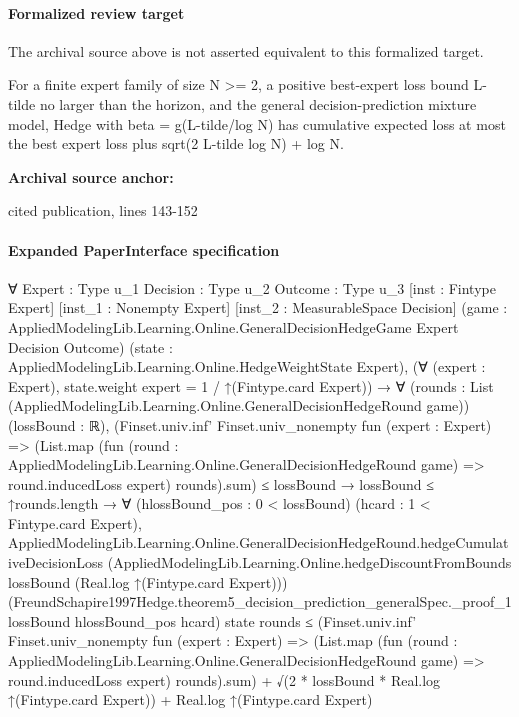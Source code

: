 \documentclass[10pt]{article}
\begin{document}
\paragraph{Formalized review target}
The archival source above is not asserted equivalent to this formalized target.
\begin{ReviewVerbatim}
For a finite expert family of size N >= 2, a positive best-expert loss bound L-tilde no larger than the horizon, and the general decision-prediction mixture model, Hedge with beta = g(L-tilde/log N) has cumulative expected loss at most the best expert loss plus sqrt(2 L-tilde log N) + log N.
\end{ReviewVerbatim}

\textbf{Archival source anchor:} {\footnotesize\raggedright cited publication, lines 143-\allowbreak{}152\par}
\paragraph{Expanded PaperInterface specification}
\begin{ReviewVerbatim}
∀ {Expert : Type u_1} {Decision : Type u_2} {Outcome : Type u_3} [inst : Fintype Expert] [inst_1 : Nonempty Expert]
  [inst_2 : MeasurableSpace Decision]
  (game : AppliedModelingLib.Learning.Online.GeneralDecisionHedgeGame Expert Decision Outcome)
  (state : AppliedModelingLib.Learning.Online.HedgeWeightState Expert),
  (∀ (expert : Expert), state.weight expert = 1 / ↑(Fintype.card Expert)) →
    ∀ (rounds : List (AppliedModelingLib.Learning.Online.GeneralDecisionHedgeRound game)) (lossBound : ℝ),
      (Finset.univ.inf' Finset.univ_nonempty fun (expert : Expert) =>
            (List.map
                (fun (round : AppliedModelingLib.Learning.Online.GeneralDecisionHedgeRound game) =>
                  round.inducedLoss expert)
                rounds).sum) ≤
          lossBound →
        lossBound ≤ ↑rounds.length →
          ∀ (hlossBound_pos : 0 < lossBound) (hcard : 1 < Fintype.card Expert),
            AppliedModelingLib.Learning.Online.GeneralDecisionHedgeRound.hedgeCumulativeDecisionLoss
                (AppliedModelingLib.Learning.Online.hedgeDiscountFromBounds lossBound (Real.log ↑(Fintype.card Expert)))
                (FreundSchapire1997Hedge.theorem5_decision_prediction_generalSpec._proof_1 lossBound hlossBound_pos
                  hcard)
                state rounds ≤
              (Finset.univ.inf' Finset.univ_nonempty fun (expert : Expert) =>
                    (List.map
                        (fun (round : AppliedModelingLib.Learning.Online.GeneralDecisionHedgeRound game) =>
                          round.inducedLoss expert)
                        rounds).sum) +
                  √(2 * lossBound * Real.log ↑(Fintype.card Expert)) +
                Real.log ↑(Fintype.card Expert)
\end{ReviewVerbatim}
\end{document}
